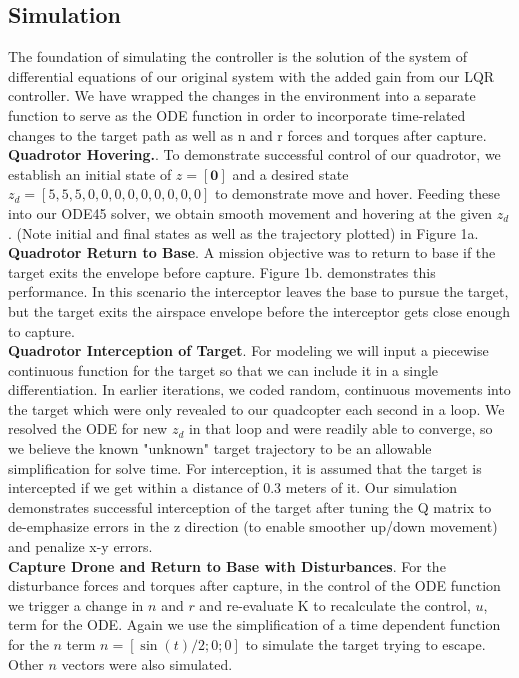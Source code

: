 \documentclass{article}
\begin{document}
\begin{multicols}{2}
\section*{Simulation}
\noindent
The foundation of simulating the controller is the solution of the system of differential equations of our original system with the added 
gain from our LQR controller.  We have wrapped the changes in the environment into a separate function to serve as the ODE 
function in order to incorporate time-related changes to the target path as well as n and r forces and torques after capture.\\
\textbf{Quadrotor Hovering.}. To demonstrate successful control of our quadrotor, we establish an initial state of $z=[\mathbf{0}]$ and 
a desired state $z_d=[5,5,5,0,0,0,0,0,0,0,0,0] $ to demonstrate move and hover.  Feeding these into our ODE45 solver, we obtain 
smooth movement and hovering at the given $z_d$.  (Note initial and final states as well as the trajectory plotted) in Figure 1a.\\
\textbf{Quadrotor Return to Base}. A mission objective was to return to base if the target exits the envelope before capture.  
Figure 1b. demonstrates this performance. In this scenario the interceptor leaves the base to pursue the target, but the target exits 
the airspace envelope before the interceptor gets close enough to capture.\\
\textbf{Quadrotor Interception of Target}. For modeling we will input a piecewise continuous function for the target so that we can 
include it in a single differentiation.  In earlier iterations, we coded random, continuous movements into the target which were only 
revealed to our quadcopter each second in a loop.  We resolved the ODE for new $z_d$ in that loop and were readily able to converge, so we believe the known "unknown" target trajectory to be an allowable simplification for solve time.
For interception, it is assumed that the target is intercepted if we get within a distance of 0.3 meters of it.   Our simulation demonstrates 
successful interception of the target after tuning the Q matrix to de-emphasize errors in the z direction (to enable smoother up/down 
movement) and penalize x-y errors.  \\
\textbf{Capture Drone and Return to Base  with Disturbances}.  For the disturbance forces and torques after capture,  in the control of the ODE function we trigger a change in $n$ and $r$ and re-evaluate K  to recalculate the control, $u$, term for the ODE.  Again we use the simplification of a time dependent function for the $n$ term $n=[\sin(t)/2; 0; 0]$ to simulate the target trying to escape.  Other $n$ vectors were also simulated.\\

\end{multicols}
\end{document}
